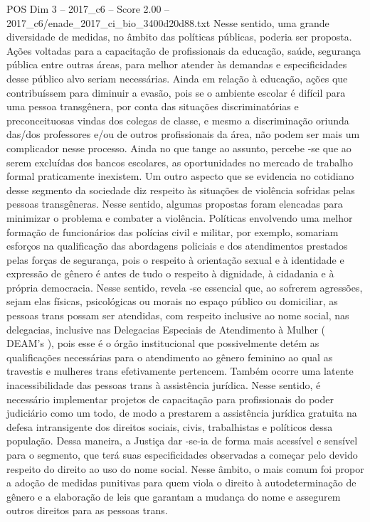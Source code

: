 \begin{textsample}{POS Dim 3 – 2017\_c6 – Score 2.00 – 2017\_c6/enade\_2017\_ci\_bio\_3400d20d88.txt}
Nesse sentido, uma grande diversidade de medidas, no âmbito das políticas públicas, poderia ser proposta.
Ações voltadas para a capacitação de profissionais da educação, saúde, segurança pública entre outras áreas, para melhor atender às demandas e especificidades desse público alvo seriam necessárias.
Ainda em relação à educação, ações que contribuíssem para diminuir a evasão, pois se o ambiente escolar é difícil para uma pessoa transgênera, por conta das situações discriminatórias e preconceituosas vindas dos colegas de classe, e mesmo a discriminação oriunda das/dos professores e/ou de outros profissionais da área, não podem ser mais um complicador nesse processo.
Ainda no que tange ao assunto, percebe -se que ao serem excluídas dos bancos escolares, as oportunidades no mercado de trabalho formal praticamente inexistem.
Um outro aspecto que se evidencia no cotidiano desse segmento da sociedade diz respeito às situações de violência sofridas pelas pessoas transgêneras.
Nesse sentido, algumas propostas foram elencadas para minimizar o problema e combater a violência.
Políticas envolvendo uma melhor formação de funcionários das polícias civil e militar, por exemplo, somariam esforços na qualificação das abordagens policiais e dos atendimentos prestados pelas forças de segurança, pois o respeito à orientação sexual e à identidade e expressão de gênero é antes de tudo o respeito à dignidade, à cidadania e à própria democracia.
Nesse sentido, revela -se essencial que, ao sofrerem agressões, sejam elas físicas, psicológicas ou morais no espaço público ou domiciliar, as pessoas trans possam ser atendidas, com respeito inclusive ao nome social, nas delegacias, inclusive nas Delegacias Especiais de Atendimento à Mulher ( DEAM’s ), pois esse é o órgão institucional que possivelmente detém as qualificações necessárias para o atendimento ao gênero feminino ao qual as travestis e mulheres trans efetivamente pertencem.
Também ocorre uma latente inacessibilidade das pessoas trans à assistência jurídica.
Nesse sentido, é necessário implementar projetos de capacitação para profissionais do poder judiciário como um todo, de modo a prestarem a assistência jurídica gratuita na defesa intransigente dos direitos sociais, civis, trabalhistas e políticos dessa população.
Dessa maneira, a Justiça dar -se-ia de forma mais acessível e sensível para o segmento, que terá suas especificidades observadas a começar pelo devido respeito do direito ao uso do nome social.
Nesse âmbito, o mais comum foi propor a adoção de medidas punitivas para quem viola o direito à autodeterminação de gênero e a elaboração de leis que garantam a mudança do nome e assegurem outros direitos para as pessoas trans.

\end{textsample}
